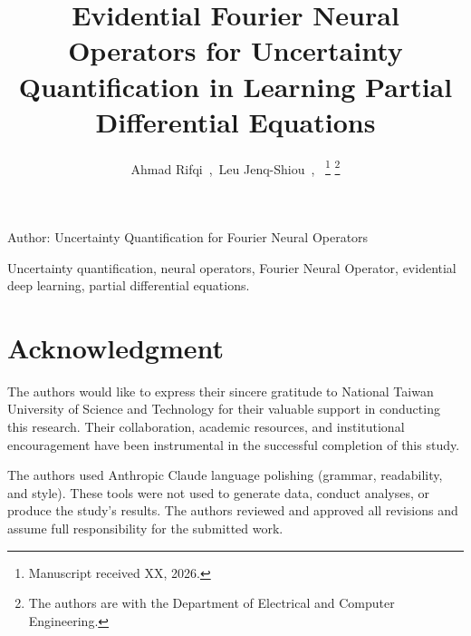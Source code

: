 \documentclass[journal]{IEEEtran}
\begin{document}
\title{Evidential Fourier Neural Operators for Uncertainty Quantification in Learning Partial Differential Equations}

\author{Ahmad Rifqi~,~Leu Jenq-Shiou~,~
\thanks{Manuscript received XX, 2026.}
\thanks{The authors are with the Department of Electrical and Computer Engineering.}}

%
{Author: Uncertainty Quantification for Fourier Neural Operators}

\maketitle



\begin{IEEEkeywords}
Uncertainty quantification, neural operators, Fourier Neural Operator, evidential deep learning, partial differential equations.
\end{IEEEkeywords}

\IEEEpeerreviewmaketitle


\section*{Acknowledgment}
The authors would like to express their sincere gratitude to National Taiwan University of Science and Technology for 
their valuable support in conducting this research. Their collaboration, academic resources, and institutional 
encouragement have been instrumental in the successful completion of this study.

The authors used Anthropic Claude language polishing (grammar, readability, and style). These tools were not 
used to generate data, conduct analyses, or produce the study's results. The authors reviewed and approved all 
revisions and assume full responsibility for the submitted work.
\end{document}
